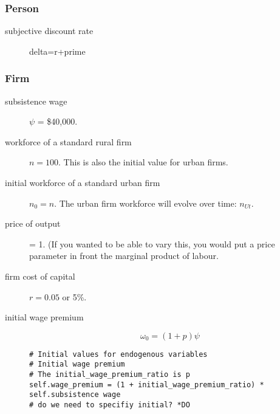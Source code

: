 \subsubsection{Person}
\begin{description}
\item[subjective discount rate] delta=r+prime
\end{description}

\subsubsection{Firm}
\begin{description}
\item [subsistence wage] $\psi$ = \$40,000. %

\item [workforce of a standard rural firm] $n=100$. This is also the initial value for urban firms.

\item [initial workforce of a standard urban firm] $n_0=n$.  The urban firm workforce will evolve over time: $n_{Ut}$. 

\item [price of output] = 1. (If you wanted to be able to vary this, you would put a price parameter in front the %
\gls{marginal product of labour}. %

\item [firm cost of capital] $r = 0.05$ or 5\%.

\item [initial wage premium ]  \[\omega_0=(1+p)\psi\]

\begin{lstlisting}
# Initial values for endogenous variables
# Initial wage premium
# The initial_wage_premium_ratio is p
self.wage_premium = (1 + initial_wage_premium_ratio) * self.subsistence wage
# do we need to specifiy initial? *DO
\end{lstlisting}

\end{description}


